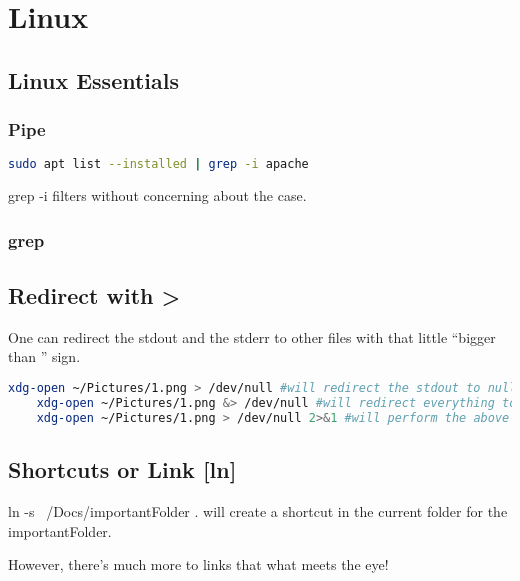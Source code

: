 


\section{Linux }


\subsection{Linux Essentials}


\subsubsection{Pipe}

\begin{lstlisting}[language=bash]
    sudo apt list --installed | grep -i apache
\end{lstlisting}
grep -i filters without concerning about the case.


\subsubsection{grep}

\subsection{Redirect with >}
One can redirect the stdout and the stderr to other files with that little ``bigger than '' sign.

\begin{lstlisting}[language=bash]
    xdg-open ~/Pictures/1.png > /dev/null #will redirect the stdout to null. 
    xdg-open ~/Pictures/1.png &> /dev/null #will redirect everything to null.
    xdg-open ~/Pictures/1.png > /dev/null 2>&1 #will perform the above and redirect stderr to stdout.    
\end{lstlisting}





\subsection{Shortcuts or Link [ln]}
ln -s ~/Docs/importantFolder .
will create a shortcut in the current folder for the importantFolder.

However, there's much more to links that what meets the eye!

\begin{center}
\end{center}

